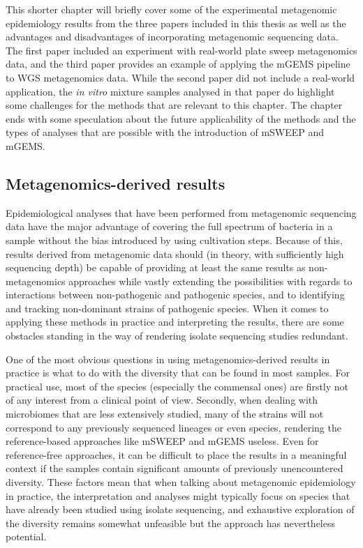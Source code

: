 \documentclass[officiallayout]{tktla}
\begin{document}
This shorter chapter will briefly cover some of the experimental metagenomic
epidemiology results from the three papers included in this thesis as
well as the advantages and disadvantages of incorporating metagenomic
sequencing data. The first paper included an experiment with
real-world plate sweep metagenomics data, and the third paper provides
an example of applying the mGEMS pipeline to WGS metagenomics
data. While the second paper did not include a real-world application,
the \textit{in vitro} mixture samples analysed in that paper do
highlight some challenges for the methods that are relevant to this
chapter. The chapter ends with some speculation about the future
applicability of the methods and the types of analyses that are
possible with the introduction of mSWEEP and mGEMS.

\subsection{Metagenomics-derived results}

Epidemiological analyses that have been performed from metagenomic
sequencing data have the major advantage of covering the full spectrum
of bacteria in a sample without the bias introduced by using
cultivation steps. Because of this, results derived from metagenomic
data should (in theory, with sufficiently high sequencing depth) be
capable of providing at least the same results as non-metagenomics
approaches while vastly extending the possibilities with regards to
interactions between non-pathogenic and pathogenic species, and to
identifying and tracking non-dominant strains of pathogenic
species. When it comes to applying these methods in practice and
interpreting the results, there are some obstacles standing in the way
of rendering isolate sequencing studies redundant.

One of the most obvious questions in using metagenomics-derived
results in practice is what to do with the diversity that can be found
in most samples. For practical use, most of the species (especially
the commensal ones) are firstly not of any interest from a clinical
point of view. Secondly, when dealing with microbiomes that are less
extensively studied, many of the strains will not correspond to any
previously sequenced lineages or even species, rendering the
reference-based approaches like mSWEEP and mGEMS useless. Even for
reference-free approaches, it can be difficult to place the results in
a meaningful context if the samples contain significant amounts of
previously unencountered diversity. These factors mean that when
talking about metagenomic epidemiology in practice, the interpretation
and analyses might typically focus on species that have already been
studied using isolate sequencing, and exhaustive exploration of the
diversity remains somewhat unfeasible but the approach has
nevertheless potential.
\end{document}
